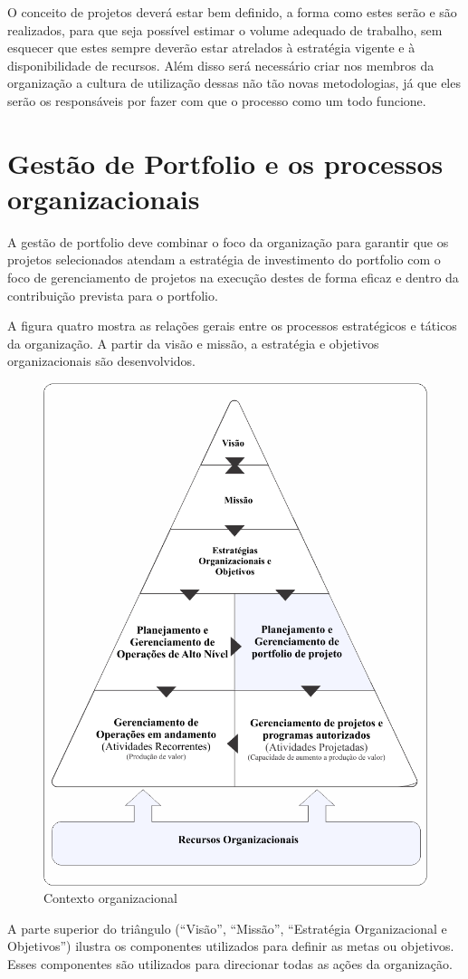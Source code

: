 \documentclass[12pt,a4paper,ruledheader,tocpage=prefix,floatnumber=continuous,pagestart=folhaderosto,font=times]{abnt}
\begin{document}
O conceito de projetos deverá estar bem definido, a forma como estes serão e são realizados, para que seja possível estimar o volume adequado de trabalho,
sem esquecer que estes sempre deverão estar atrelados à estratégia vigente e à disponibilidade de recursos. Além disso será necessário criar nos membros 
da organização a cultura de utilização dessas não tão novas metodologias, já que eles serão os responsáveis por fazer com que o processo como um todo 
funcione.

\section{Gestão de Portfolio e os processos organizacionais}
A gestão de portfolio deve combinar o foco da organização para garantir que os projetos selecionados atendam a estratégia de investimento do 
portfolio com o foco de gerenciamento de projetos na execução destes de forma eficaz e dentro da contribuição prevista para o portfolio.

A figura quatro mostra as relações gerais entre os processos estratégicos e táticos da organização. A partir da visão e missão, a estratégia e 
objetivos organizacionais são desenvolvidos.

\begin{figure}[H]
\centering
\includegraphics[width=.6\textwidth]{img/fig4.png}
\caption{Contexto organizacional}
\end{figure}

A parte superior do triângulo (``Visão'', ``Missão'', ``Estratégia Organizacional e Objetivos'') ilustra os componentes utilizados para definir  as metas 
ou objetivos. Esses componentes são utilizados para direcionar todas as ações da organização. 
\end{document}
